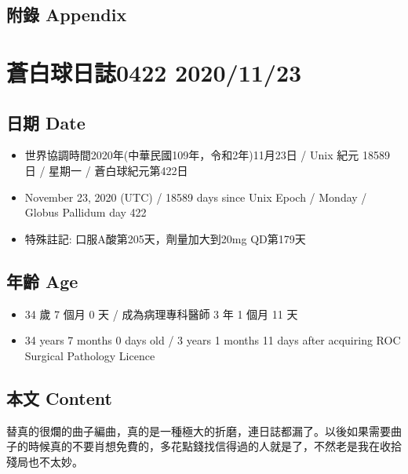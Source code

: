 \documentclass[
]{article}
\providecommand{\tightlist}{%
  \setlength{\itemsep}{0pt}\setlength{\parskip}{0pt}}
\begin{document}
\hypertarget{ux9644ux9304-appendix-15}{%
\subsection{附錄 Appendix}\label{ux9644ux9304-appendix-15}}

\hypertarget{ux84bcux767dux7403ux65e5ux8a8c0422-20201123}{%
\section{蒼白球日誌0422
2020/11/23}\label{ux84bcux767dux7403ux65e5ux8a8c0422-20201123}}

\hypertarget{ux65e5ux671f-date-16}{%
\subsection{日期 Date}\label{ux65e5ux671f-date-16}}

\begin{itemize}
\tightlist
\item
  世界協調時間2020年(中華民國109年，令和2年)11月23日 / Unix 紀元 18589
  日 / 星期一 / 蒼白球紀元第422日
\item
  November 23, 2020 (UTC) / 18589 days since Unix Epoch / Monday /
  Globus Pallidum day 422
\item
  特殊註記: 口服A酸第205天，劑量加大到20mg QD第179天
\end{itemize}

\hypertarget{ux5e74ux9f61-age-16}{%
\subsection{年齡 Age}\label{ux5e74ux9f61-age-16}}

\begin{itemize}
\tightlist
\item
  34 歲 7 個月 0 天 / 成為病理專科醫師 3 年 1 個月 11 天
\item
  34 years 7 months 0 days old / 3 years 1 months 11 days after
  acquiring ROC Surgical Pathology Licence
\end{itemize}

\hypertarget{ux672cux6587-content-16}{%
\subsection{本文 Content}\label{ux672cux6587-content-16}}

替真的很爛的曲子編曲，真的是一種極大的折磨，連日誌都漏了。以後如果需要曲子的時候真的不要肖想免費的，多花點錢找信得過的人就是了，不然老是我在收拾殘局也不太妙。
\end{document}
